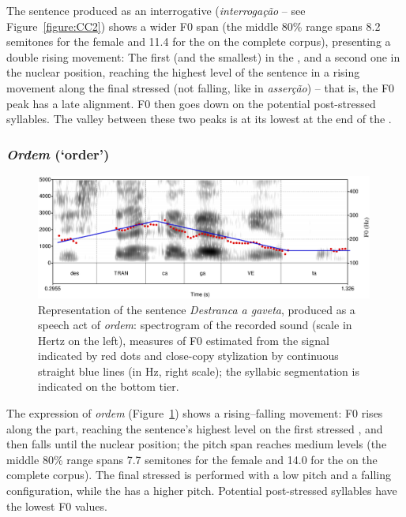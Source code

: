 \documentclass[output=paper]{LSP/langsci}
\begin{document}
The sentence produced as an interrogative  (\textit{interrogação} -- see Figure~\ref{figure:CC2}) shows a wider F0 span (the middle 80\% range spans 8.2 semitones for the female and 11.4 for the  on the complete corpus), presenting a double rising movement: The first (and the smallest) in the , and a second one in the nuclear position, reaching the highest level of the sentence in a rising movement along the final stressed  (not falling, like in \textit{asserção}) -- that is, the F0 peak has a late alignment. 
F0 then goes down on the potential post-stressed syllables. 
The valley between these two peaks is at its lowest at the end of the .


\subsubsection{\textit{Ordem} (`order')}


\begin{figure}

\includegraphics[width=0.99\textwidth]{figures/MOR5.eps}
\caption{Representation of the sentence \textit{Destranca a gaveta}, produced as a speech act of \textit{ordem}: spectrogram of the recorded sound (scale in Hertz on the left), measures of F0 estimated from the signal indicated by red dots and close-copy stylization by continuous straight blue lines (in Hz, right scale); the syllabic segmentation is indicated on the bottom tier.}
\label{figure:CC3}
\end{figure}

The expression of \textit{ordem} (Figure~\ref{figure:CC3}) shows a rising–falling movement: F0 rises along the  part, reaching the sentence's highest level on the first stressed , and then falls until the nuclear position; the pitch span reaches medium levels (the middle 80\% range spans 7.7 semitones for the female and 14.0 for the  on the complete corpus). 
The final stressed  is performed with a low pitch and a falling configuration, while the  has a higher pitch. 
Potential post-stressed syllables have the lowest F0 values.
\end{document}
